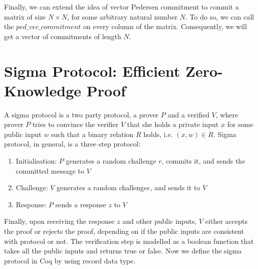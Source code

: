  
\noindent
Finally,  we can extend the idea of vector Pedersen commitment to commit a matrix of size  $N \times N$,  for some arbitrary natural number $N$.
To do so, we can call the $ped\_vec\_commitment$ on every column of the matrix.   Consequently, 
we  will get a vector of commitments of length $N$.



\section{Sigma Protocol: Efficient Zero-Knowledge Proof}
\label{sec:sigma_coq}
A sigma protocol is a two party protocol, a prover $P$ and a verified $V$, where prover $P$ tries to convince the verifier $V$ that she 
holds a private input $x$ for some public input $w$ such that a binary relation $R$ holds, i.e. $(x, w) \in R$.  Sigma protocol, 
in general, is a three step protocol:
\begin{enumerate}
\item Initialisation: $P$ generates a random challenge $r$, commits it, and sends the committed message to $V$
\item Challenge: $V$ generates a random challenge$e$, and sends it to $V$
\item Response: $P$ sends a response $z$ to $V$
\end{enumerate} 

\noindent
Finally, upon receiving the response $z$ and other public inputs, $V$ 
either accepts the proof or rejects the proof,  depending on if the public inputs are consistent with protocol or not.  The verification step is 
modelled as a boolean function that takes all the public inputs and returns true or false.  
Now we define the sigma protocol in Coq by using record data type.

